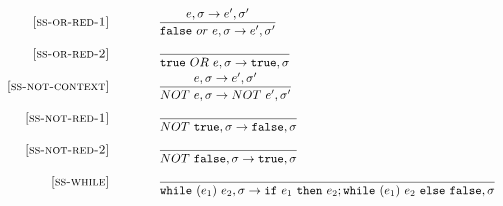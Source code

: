 \documentclass{article}
\begin{document}
\begin{figure}
\[\begin{array}{r@{\qquad\qquad}l}
\ssrule{ss-or-red-1}{
  \sstep{e}{\sigma}{e'}{\sigma'}
}{
  \sstep{\false~or~e}{\sigma}{e'}{\sigma'}
}

\ssrule{ss-or-red-2}{
}{
  \sstep{\true~OR~e}{\sigma}{\true}{\sigma}
}

\ssrule{ss-not-context}{
  \sstep{e}{\sigma}{e'}{\sigma'}
}{
  \sstep{NOT~e}{\sigma}{NOT~e'}{\sigma'}
}

\ssrule{ss-not-red-1}{
}{
  \sstep{NOT~\true}{\sigma}{\false}{\sigma}
}

\ssrule{ss-not-red-2}{
}{
  \sstep{NOT~\false}{\sigma}{\true}{\sigma}
}

\ssrule{ss-while}{
}{
  \sstep{\whilee{e_1}{e_2}}{\sigma}{\ife{e_1}{e_2;\whilee{e_1}{e_2}}{\false}}{\sigma}
}
\end{array}
\]
\end{figure}
\end{document}
